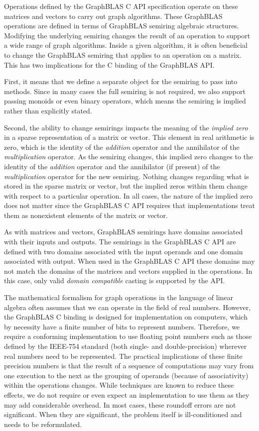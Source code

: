 Operations defined by the GraphBLAS C API specification operate on these 
matrices and vectors to carry out graph algorithms.  These GraphBLAS 
operations are defined in terms of GraphBLAS semiring algebraic 
structures. Modifying the underlying semiring changes the result of 
an operation to support a wide range of graph algorithms.
Inside a given algorithm, it is often beneficial to change the GraphBLAS 
semiring that applies to an operation on a matrix.  This has two 
implications for the C binding of the GraphBLAS API.  

First, it means that we define a separate object for the semiring 
to pass into methods.  Since in many cases the full
semiring is not required, we also support passing monoids or
even binary operators, which means the semiring is implied rather than 
explicitly stated.

Second, the ability to change semirings impacts the meaning of 
the \emph{implied zero} in a sparse representation of a matrix or vector.
This element in real arithmetic is zero, which is the 
identity of the \emph{addition} operator and the annihilator of the
\emph{multiplication} operator.  As the semiring changes, this 
implied zero changes to the identity of the \emph{addition} operator 
and the annihilator (if present) of the \emph{multiplication} operator 
for the new semiring. Nothing changes regarding what is stored in the sparse 
matrix or vector, but the implied zeros within them change with respect to a 
particular operation. In all cases, the nature of the implied zero does not 
matter since the GraphBLAS C API requires that implementations treat them as 
nonexistent elements of the matrix or vector.

As with matrices and vectors, GraphBLAS semirings have domains
associated with their inputs and outputs.  The semirings in the 
GraphBLAS C API are defined with two domains associated with the input operands and one 
domain associated with output.  When used in the GraphBLAS C API these
domains may not match the domains of the matrices and vectors supplied in
the operations.  In this case, only valid \emph{domain compatible} casting 
is supported by the API.

The mathematical formalism for graph operations in the language of 
linear algebra often assumes that we can operate in the field of real numbers. 
However, the GraphBLAS C binding is designed for implementation on computers, 
which by necessity have a finite number of bits to represent numbers. 
Therefore, we require a conforming implementation to use floating point 
numbers such as those defined by the IEEE-754 standard (both single- and double-precision) 
wherever real numbers need to be represented. The practical implications of 
these finite precision numbers is that the result of a sequence of 
computations may vary from one execution to the next as the grouping of operands
(because of associativity) within the operations changes.  While techniques are known to 
reduce these effects, we do not require or even expect an implementation 
to use them as they may add considerable overhead. In most 
cases, these roundoff errors are not significant. When they are significant, 
the problem itself is ill-conditioned and needs to be reformulated.


